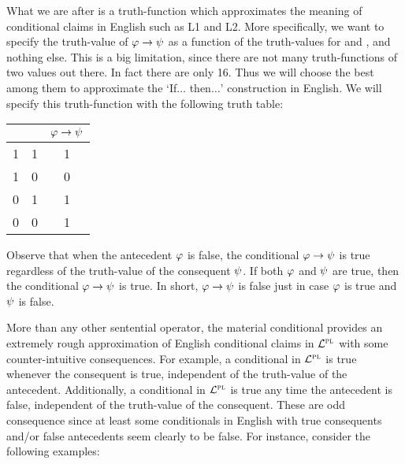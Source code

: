 What we are after is a truth-function which approximates the meaning of conditional claims in English such as L1 and L2.
More specifically, we want to specify the truth-value of $\varphi{}\rightarrow\psi{}$ as a function of the truth-values for \metaA{} and \metaB{}, and nothing else.
This is a big limitation, since there are not many truth-functions of two values out there.
In fact there are only 16.
Thus we will choose the best among them to approximate the `If$\ldots$ then$\ldots$' construction in English.
We will specify this truth-function with the following truth table:

\begin{center}
\begin{tabular}{c|c|c}
\metaA{} & \metaB{} & $\varphi{}\rightarrow\psi{}$\\
\hline
1 & 1 & 1\\
1 & 0 & 0\\
0 & 1 & 1\\
0 & 0 & 1
\end{tabular}
\end{center}
 
Observe that when the antecedent $\varphi$ is false, the conditional $\varphi \rightarrow \psi$ is true regardless of the truth-value of the consequent $\psi$.
If both $\varphi$ and $\psi$ are true, then the conditional $\varphi \rightarrow \psi$ is true.
In short, $\varphi \rightarrow \psi$ is false just in case $\varphi$ is true and $\psi$ is false.

More than any other sentential operator, the material conditional provides an extremely rough approximation of English conditional claims in $\mathcal{L}^{\textsc{pl}}$ with some counter-intuitive consequences.
For example, a conditional in $\mathcal{L}^{\textsc{pl}}$ is true whenever the consequent is true, independent of the truth-value of the antecedent.
Additionally, a conditional in $\mathcal{L}^{\textsc{pl}}$ is true any time the antecedent is false, independent of the truth-value of the consequent.
These are odd consequence since at least some conditionals in English with true consequents and/or false antecedents seem clearly to be false.
For instance, consider the following examples:

\begin{earg} \label{mit}
\end{earg}

